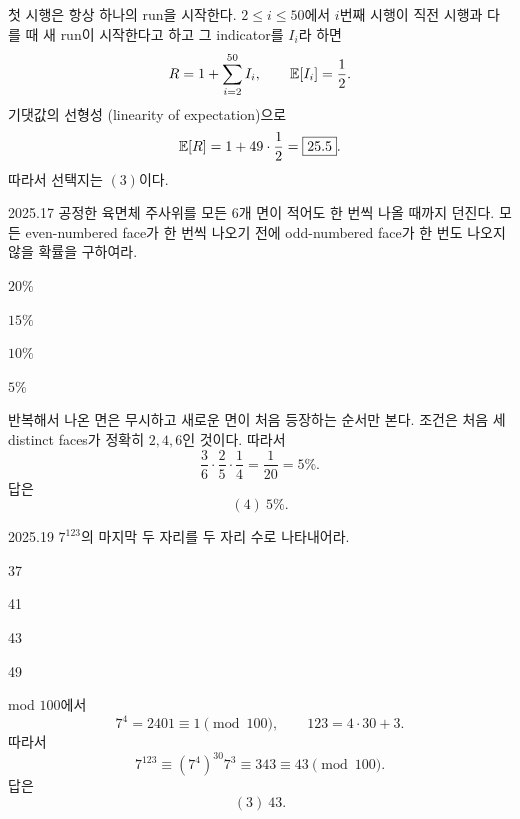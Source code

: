\begin{solution}
첫 시행은 항상 하나의 run을 시작한다. $2\le i\le50$에서 $i$번째 시행이 직전 시행과 다를 때 새 run이 시작한다고 하고 그 indicator를 $I_i$라 하면
\[
R=1+\sum_{i=2}^{50}I_i,
\qquad
\mathbb{E}[I_i]=\frac12.
\]
기댓값의 선형성 (linearity of expectation)으로
\[
\mathbb{E}[R]=1+49\cdot\frac12=\boxed{25.5}.
\]
따라서 선택지는 $\boxed{(3)}$이다.
\end{solution}

\begin{pastproblem}{2025.17}
공정한 육면체 주사위를 모든 $6$개 면이 적어도 한 번씩 나올 때까지 던진다. 모든 even-numbered face가 한 번씩 나오기 전에 odd-numbered face가 한 번도 나오지 않을 확률을 구하여라.
\begin{problemchoices}
\item $20\%$
\item $15\%$
\item $10\%$
\item $5\%$
\end{problemchoices}
\end{pastproblem}

\begin{solution}
반복해서 나온 면은 무시하고 새로운 면이 처음 등장하는 순서만 본다. 조건은 처음 세 distinct faces가 정확히 $2,4,6$인 것이다. 따라서
\[
\frac36\cdot\frac25\cdot\frac14
=\frac1{20}=5\%.
\]
답은
\[
\boxed{(4)\ 5\%}.
\]
\end{solution}

\begin{pastproblem}{2025.19}
$7^{123}$의 마지막 두 자리를 두 자리 수로 나타내어라.
\begin{problemchoices}
\item 37
\item 41
\item 43
\item 49
\end{problemchoices}
\end{pastproblem}

\begin{solution}
mod $100$에서
\[
7^4=2401\equiv1\pmod{100},
\qquad
123=4\cdot30+3.
\]
따라서
\[
7^{123}\equiv(7^4)^{30}7^3\equiv343\equiv43\pmod{100}.
\]
답은
\[
\boxed{(3)\ 43}.
\]
\end{solution}
